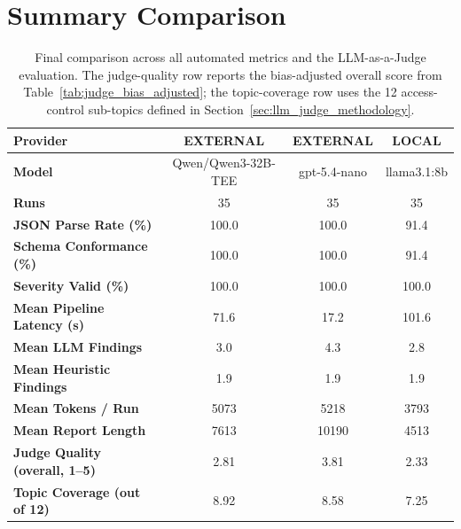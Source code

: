 \documentclass[]{UCD_CS_FYP_Report}
\begin{document}
\section{Summary Comparison}
\label{sec:results_summary}
 
\begin{table}[!ht]
    \centering
    {\footnotesize
        \begin{tabular}{|l|c|c|c|}
        \hline
            \textbf{Provider}                       & EXTERNAL            & EXTERNAL     & LOCAL        \\ \hline
            \textbf{Model}                          & Qwen/Qwen3-32B-TEE  & gpt-5.4-nano & llama3.1:8b  \\ \hline
            \textbf{Runs}                           & 35                  & 35           & 35           \\ \hline
            \textbf{JSON Parse Rate (\%)}           & 100.0               & 100.0        & 91.4         \\ \hline
            \textbf{Schema Conformance (\%)}        & 100.0               & 100.0        & 91.4         \\ \hline
            \textbf{Severity Valid (\%)}            & 100.0               & 100.0        & 100.0        \\ \hline
            \textbf{Mean Pipeline Latency (s)}      & 71.6                & 17.2         & 101.6        \\ \hline
            \textbf{Mean LLM Findings}              & 3.0                 & 4.3          & 2.8          \\ \hline
            \textbf{Mean Heuristic Findings}        & 1.9                 & 1.9          & 1.9          \\ \hline
            \textbf{Mean Tokens / Run}              & 5073                & 5218         & 3793         \\ \hline
            \textbf{Mean Report Length}             & 7613                & 10190        & 4513         \\ \hline
            \textbf{Judge Quality (overall, 1--5)}  & 2.81                & 3.81         & 2.33         \\ \hline
            \textbf{Topic Coverage (out of 12)}     & 8.92                & 8.58         & 7.25         \\ \hline
        \end{tabular}
    }
    \caption{Final comparison across all automated metrics and the LLM-as-a-Judge evaluation. The judge-quality row reports the bias-adjusted overall score from Table~\ref{tab:judge_bias_adjusted}; the topic-coverage row uses the 12 access-control sub-topics defined in Section~\ref{sec:llm_judge_methodology}.}
    \label{tab:final_comparison}
\end{table}
 
\end{document}
